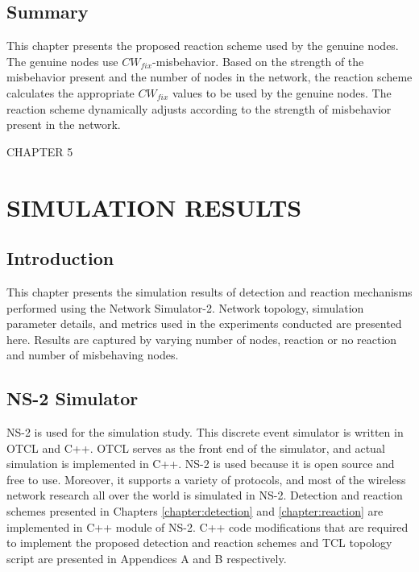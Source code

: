 \documentclass[12pt,letterpaper,english]{article}
\begin{document}
\subsection{Summary}
\label{summaryreaction}
\indent This chapter presents the proposed reaction scheme used by the genuine nodes. The genuine nodes use $CW_{fix}$-misbehavior. Based on the strength of the misbehavior present and the number of nodes in the network, the reaction scheme calculates the appropriate $CW_{fix}$ values to be used by the genuine nodes. The reaction scheme dynamically adjusts according to the strength of misbehavior present in the network.
\newpage
\setcounter{figure}{0}
\setcounter{table}{0}
\setcounter{subsection}{0}
\begin{singlespace}
\begin{center}
CHAPTER 5
\section*{SIMULATION RESULTS}
\addtocounter{section}{1}
\label{chapter:simulation}
\end{center}
\end{singlespace}
\subsection{Introduction}
\indent This chapter presents the simulation results of detection and reaction mechanisms performed using the Network Simulator-2.
Network topology, simulation parameter details, and metrics used in the experiments conducted are presented here.
Results are captured by varying number of nodes, reaction or no reaction and number of misbehaving nodes.
\subsection{NS-2 Simulator}
\indent NS-2 is used for the simulation study. This discrete event simulator is written in OTCL and C++. OTCL serves as the front end of the simulator, and actual simulation is implemented in C++. 
NS-2 is used because it is open source and free to use. Moreover, it supports a variety of protocols, and most of the wireless network research all over the world is simulated in NS-2.
Detection and reaction schemes presented in Chapters \ref{chapter:detection} and \ref{chapter:reaction} are implemented in C++ module of NS-2. C++ code modifications that are required to implement the proposed detection and reaction schemes and TCL topology script are presented in Appendices A and B respectively.
\end{document}
